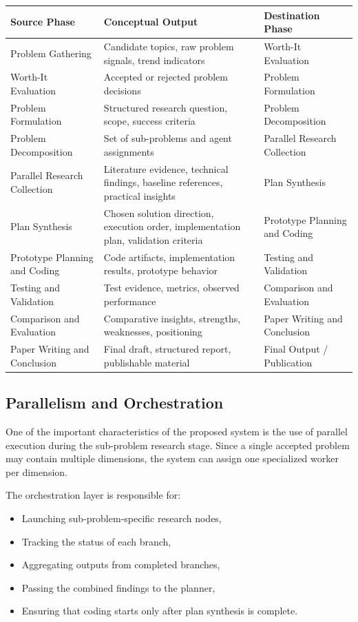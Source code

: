 \documentclass[11pt,a4paper]{article}
\begin{document}
\begin{longtable}{p{3.6cm} p{5.2cm} p{5.2cm}}
\toprule
\textbf{Source Phase} & \textbf{Conceptual Output} & \textbf{Destination Phase} \\
\midrule
Problem Gathering & Candidate topics, raw problem signals, trend indicators & Worth-It Evaluation \\
Worth-It Evaluation & Accepted or rejected problem decisions & Problem Formulation \\
Problem Formulation & Structured research question, scope, success criteria & Problem Decomposition \\
Problem Decomposition & Set of sub-problems and agent assignments & Parallel Research Collection \\
Parallel Research Collection & Literature evidence, technical findings, baseline references, practical insights & Plan Synthesis \\
Plan Synthesis & Chosen solution direction, execution order, implementation plan, validation criteria & Prototype Planning and Coding \\
Prototype Planning and Coding & Code artifacts, implementation results, prototype behavior & Testing and Validation \\
Testing and Validation & Test evidence, metrics, observed performance & Comparison and Evaluation \\
Comparison and Evaluation & Comparative insights, strengths, weaknesses, positioning & Paper Writing and Conclusion \\
Paper Writing and Conclusion & Final draft, structured report, publishable material & Final Output / Publication \\
\bottomrule
\end{longtable}

\subsection{Parallelism and Orchestration}

One of the important characteristics of the proposed system is the use of parallel execution during the sub-problem research stage. Since a single accepted problem may contain multiple dimensions, the system can assign one specialized worker per dimension.

The orchestration layer is responsible for:
\begin{itemize}
    \item Launching sub-problem-specific research nodes,
    \item Tracking the status of each branch,
    \item Aggregating outputs from completed branches,
    \item Passing the combined findings to the planner,
    \item Ensuring that coding starts only after plan synthesis is complete.
\end{itemize}
\end{document}
